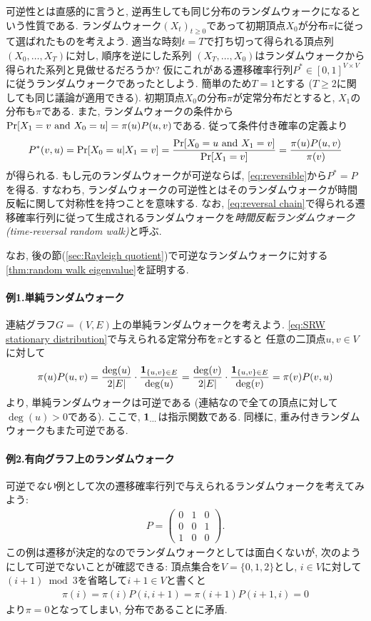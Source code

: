 可逆性とは直感的に言うと, 逆再生しても同じ分布のランダムウォークになるという性質である.
ランダムウォーク$(X_t)_{t\ge 0}$であって初期頂点$X_0$が分布$\pi$に従って選ばれたものを考えよう.
適当な時刻$t=T$で打ち切って得られる頂点列$(X_0,\dots,X_T)$に対し, 順序を逆にした系列
$(X_T,\dots,X_0)$はランダムウォークから得られた系列と見做せるだろうか?
仮にこれがある遷移確率行列$P^*\in[0,1]^{V\times V}$に従うランダムウォークであったとしよう.
簡単のため$T=1$とする ($T\ge 2$に関しても同じ議論が適用できる).
初期頂点$X_0$の分布$\pi$が定常分布だとすると, $X_1$の分布も$\pi$である.
また, ランダムウォークの条件から$\Pr[X_1 = v \text{ and } X_0=u] = \pi(u)P(u,v)$である.
従って条件付き確率の定義より
\begin{align}
    P^*(v,u) = \Pr[X_0 = u | X_1 = v] = \frac{\Pr[X_0 = u \text{ and } X_1 = v]}{\Pr[X_1 = v]} = \frac{\pi(u)P(u,v)}{\pi(v)} \label{eq:reversal chain}
\end{align}
が得られる.
もし元のランダムウォークが可逆ならば, \cref{eq:reversible}から$P^*=P$を得る.
すなわち, ランダムウォークの可逆性とはそのランダムウォークが時間反転に関して対称性を持つことを意味する.
なお, \cref{eq:reversal chain}で得られる遷移確率行列に従って生成されるランダムウォークを\emph{時間反転ランダムウォーク (time-reversal random walk)}と呼ぶ.

なお, 後の節(\cref{sec:Rayleigh quotient})で可逆なランダムウォークに対する\cref{thm:random walk eigenvalue}を証明する.

\paragraph*{例1.単純ランダムウォーク}
連結グラフ$G=(V,E)$上の単純ランダムウォークを考えよう.
\cref{eq:SRW stationary distribution}で与えられる定常分布を$\pi$とすると
任意の二頂点$u,v\in V$に対して
\[
    \pi(u) P(u,v) = \frac{\deg(u)}{2|E|} \cdot \frac{\mathbf{1}_{\{u,v\}\in E}}{\deg(u)}
    = \frac{\deg(v)}{2|E|} \cdot \frac{\mathbf{1}_{\{u,v\}\in E}}{\deg(v)}
    = \pi(v) P(v,u)
\]
より, 単純ランダムウォークは可逆である (連結なので全ての頂点に対して$\deg(u)>0$である).
ここで, $\mathbf{1}_{\dots}$は指示関数である.
同様に, 重み付きランダムウォークもまた可逆である.

\paragraph*{例2.有向グラフ上のランダムウォーク}
可逆で\emph{ない}例として次の遷移確率行列で与えられるランダムウォークを考えてみよう:
\begin{align*}
    P = \begin{pmatrix}
            0 & 1 & 0 \\
            0 & 0 & 1 \\
            1 & 0 & 0
        \end{pmatrix}.
\end{align*}
この例は遷移が決定的なのでランダムウォークとしては面白くないが,
次のようにして可逆でないことが確認できる:
頂点集合を$V=\{0,1,2\}$とし, $i\in V$に対して$(i+1)\bmod 3$を省略して$i+1 \in V$と書くと
\begin{align*}
    \pi(i) = \pi(i) P(i, i+1) = \pi(i+1)P(i+1,i) = 0
\end{align*}
より$\pi=0$となってしまい, 分布であることに矛盾.

